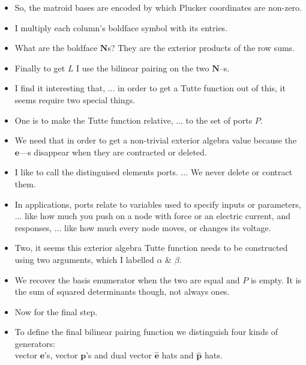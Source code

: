 \documentclass[14pt]{extarticle}
\begin{document}
{\begin{itemize}
\item
So, the matroid bases are encoded by which Plucker coordinates are non-zero.

\item
I multiply each column's boldface symbol with its entries.

\item
  What are the boldface $\mathbf{N}$s?
  They are the exterior products of the row sums.

\item
  Finally to get $L$ I use the bilinear pairing on the two $\mathbf{N}$--s.

\item
  I find it interesting that, ... in order to get a Tutte function out
  of this, it seems require two special things.

\item
One is to make the Tutte function relative, ... to the set of ports $P$.

\item
  We need that in order to get a non-trivial exterior algebra
  value because the $\mathbf{e}$---s  disappear when they are contracted or deleted.

\item
  I like to call the distinguised elements ports. ... We never delete or contract them.


\item In applications, ports relate to variables used to specify inputs
  or parameters, ... like how much you push on a node with force or an electric current,
  and responses, ... like how much every node moves, or changes its voltage.

\item
  Two, it seems this exterior algebra Tutte function needs to be constructed using
  two arguments, which I labelled $\alpha$ \& $\beta$.

\item
  We recover the basis enumerator when the two are equal and $P$ is empty.  It
  is the sum of squared determinants though, not always ones.

\item Now for the final step.

\item
  To define the final bilinear pairing function 
  we distinguish 
  four kinds of generators:\\
  vector $\mathbf{e}$'s, vector $\mathbf{p}$'s and
dual vector $\widehat{\mathbf{e}}$ hats and $\widehat{\mathbf{p}}$ hats.  


\end{itemize}}
\end{document}

